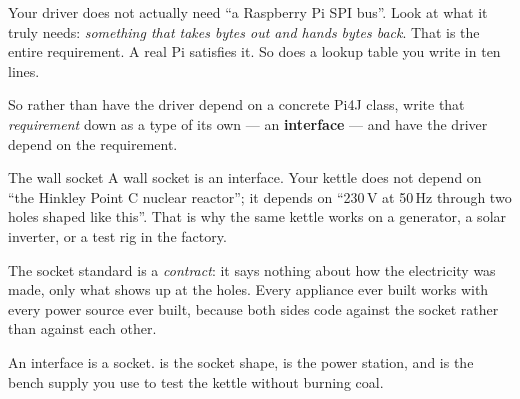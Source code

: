 Your driver does not actually need ``a Raspberry Pi SPI bus''. Look at what it
truly needs: \emph{something that takes bytes out and hands bytes back}. That is
the entire requirement. A real Pi satisfies it. So does a lookup table you write
in ten lines.

So rather than have the driver depend on a concrete Pi4J class, write that
\emph{requirement} down as a type of its own --- an \textbf{interface}
 --- and have the driver depend on the requirement.

\begin{analogy}{The wall socket}
A wall socket is an interface. Your kettle does not depend on ``the Hinkley
Point C nuclear reactor''; it depends on ``230\,V at 50\,Hz through two holes
shaped like this''. That is why the same kettle works on a generator, a solar
inverter, or a test rig in the factory.

The socket standard is a \emph{contract}: it says nothing about how the
electricity was made, only what shows up at the holes. Every appliance ever
built works with every power source ever built, because both sides code against
the socket rather than against each other.

An interface is a socket.  is the socket shape, 
is the power station, and  is the bench supply you use to test
the kettle without burning coal.
\end{analogy}

\begin{center}
\end{center}

